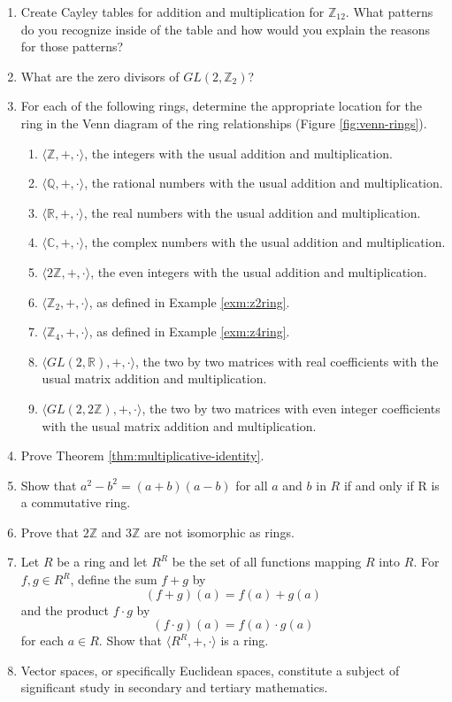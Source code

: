 \documentclass[
]{book}
\providecommand{\tightlist}{%
  \setlength{\itemsep}{0pt}\setlength{\parskip}{0pt}}
\theoremstyle{definition}
\theoremstyle{definition}
\theoremstyle{definition}
\theoremstyle{definition}
\theoremstyle{remark}
\begin{document}
\begin{enumerate}
\def\labelenumi{\arabic{enumi}.}
\item
  Create Cayley tables for addition and multiplication for \(\mathbb{Z}_{12}\). What patterns do you recognize inside of the table and how would you explain the reasons for those patterns?
\item
  What are the zero divisors of \(GL(2,\mathbb{Z}_2)\)?
\item
  For each of the following rings, determine the appropriate location for the ring in the Venn diagram of the ring relationships (Figure \ref{fig:venn-rings}).

  \begin{enumerate}
  \def\labelenumii{\alph{enumii}.}
  \tightlist
  \item
    \(\langle\mathbb{Z},+,\cdot\rangle\), the integers with the usual addition and multiplication.
  \item
    \(\langle\mathbb{Q},+,\cdot\rangle\), the rational numbers with the usual addition and multiplication.
  \item
    \(\langle\mathbb{R},+,\cdot\rangle\), the real numbers with the usual addition and multiplication.
  \item
    \(\langle\mathbb{C},+,\cdot\rangle\), the complex numbers with the usual addition and multiplication.
  \item
    \(\langle2\mathbb{Z},+,\cdot\rangle\), the even integers with the usual addition and multiplication.
  \item
    \(\langle\mathbb{Z}_2,+,\cdot\rangle\), as defined in Example \ref{exm:z2ring}.
  \item
    \(\langle\mathbb{Z}_4,+,\cdot\rangle\), as defined in Example \ref{exm:z4ring}.
  \item
    \(\langle GL(2,\mathbb{R}),+,\cdot\rangle\), the two by two matrices with real coefficients with the usual matrix addition and multiplication.
  \item
    \(\langle GL(2,2\mathbb{Z}),+,\cdot\rangle\), the two by two matrices with even integer coefficients with the usual matrix addition and multiplication.
  \end{enumerate}
\item
  Prove Theorem \ref{thm:multiplicative-identity}.
\item
  Show that \(a^2-b^2=(a+b)(a-b)\) for all \(a\) and \(b\) in \(R\) if and only if R is a commutative ring.
\item
  Prove that \(2\mathbb{Z}\) and \(3\mathbb{Z}\) are not isomorphic as rings.
\item
  Let \(R\) be a ring and let \(R^R\) be the set of all functions mapping \(R\) into \(R\). For \(f,g\in R^R\), define the sum \(f+g\) by \[(f+g)(a)=f(a)+g(a)\] and the product \(f\cdot g\) by \[(f\cdot g)(a)=f(a)\cdot g(a)\] for each \(a \in R\). Show that \(\langle R^R, +, \cdot\rangle\) is a ring.
\item
  Vector spaces, or specifically Euclidean spaces, constitute a subject of significant study in secondary and tertiary mathematics.


\end{enumerate}
\end{document}
